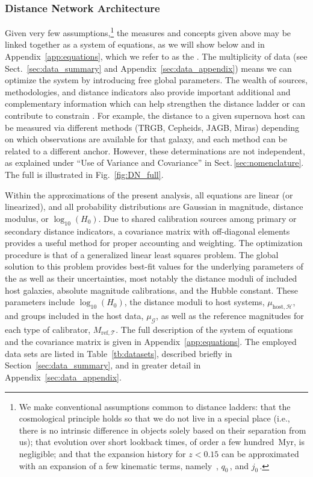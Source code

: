 \subsubsection {Distance Network Architecture}

Given very few assumptions,\footnote{We make conventional assumptions common to distance ladders: that the cosmological principle holds so that we do not live in a special place (i.e., there is no intrinsic difference in objects solely based on their separation from us); that evolution over short lookback times, of order a few hundred~Myr, is negligible; and that the expansion history for $z<0.15$ can be approximated with an expansion of a few kinematic terms, namely {\Hcst}\,, $q_0$\,, and $j_0$\,.} the measures and concepts given above may be linked together as a system of equations, as we will show below and in Appendix~\ref{app:equations}, which we refer to as the {\DN}. The multiplicity of data (see Sect.~\ref{sec:data_summary} and Appendix~\ref{sec:data_appendix}) means we can optimize the system by introducing free global parameters.   The wealth of sources, methodologies, and distance indicators also provide important additional and complementary  information which can help strengthen the distance ladder or can contribute to constrain {\Hcst}.  For example, the distance to a given supernova host can be measured via different methods (TRGB, Cepheids, JAGB, Miras) depending on which observations are available for that galaxy, and each method can be related to a different anchor.  However, these determinations are not independent, as explained under ``Use of Variance and Covariance'' in Sect.\,\ref{sec:nomenclature}. The full {\DN} is illustrated in Fig.~\ref{fig:DN_full}.

Within the approximations of the present analysis, all equations are linear (or linearized), and all probability distributions are Gaussian in magnitude, distance modulus, or $\log_{10}{(H_0)}$.
Due to shared calibration sources among primary or secondary distance indicators, a covariance matrix with off-diagonal elements provides a useful method for proper accounting and weighting. The optimization procedure is that of a generalized linear least squares problem. The global solution to this problem provides best-fit values for the underlying parameters of the {\DN} as well as their uncertainties, most notably the distance moduli of included host galaxies, absolute magnitude calibrations, and the Hubble constant. These parameters include $\log_{10}{(H_0)}$, the distance moduli to host systems, $\mu_{\mathrm{host},\mathcal{H}}$, and groups included in the host data, $\mu_{\mathcal{G}}$, as well as the reference magnitudes for each type of calibrator, $M_{\mathrm{ref},\mathcal{T}}$. %
The full description of the system of equations and the covariance matrix is given in Appendix~\ref{app:equations}. The employed data sets are listed in Table~\ref{tb:datasets}, described briefly in Section~\ref{sec:data_summary}, and in greater detail in Appendix~\ref{sec:data_appendix}.  


